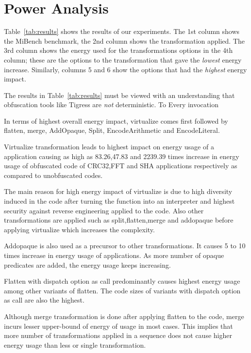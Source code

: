\section{Power Analysis}
\label{sec:analysis}


%

Table~\ref{tab:results} shows the results of our experiments. The 1st column shows the MiBench benchmark, the 2nd column shows the transformation applied. The 3rd column shows the energy used for the transformations options in the 4th column; these are the options to the transformation that gave the {\em lowest} energy increase. Similarly, columns 5 and 6 show the options that had the {\em highest} energy impact.

The results in Table~\ref{tab:results} must be viewed with an understanding that obfuscation tools like Tigress are {\em not} deterministic. To Every invocation 

In terms of highest overall energy impact, virtualize comes first followed by flatten, merge, AddOpaque, Split, EncodeArithmetic and EncodeLiteral.

Virtualize transformation leads to highest impact on energy usage of a application causing as high as 83.26,47.83 and 2239.39 times increase in energy usage of obfuscated code of CRC32,FFT and SHA applications respectively as compared to unobfuscated codes.

The main reason for high energy impact of virtualize is due to high diversity induced in the code after turning the function into an interpreter and highest security against reverse engineering applied to the code. Also other transformations are applied such as split,flatten,merge and addopaque before applying virtualize which increases the complexity. 

Addopaque is also used as a precursor to other transformations. It causes 5 to 10 times increase in energy usage of applications. As more number of opaque predicates are added, the energy usage keeps increasing.

Flatten with dispatch option as call predominantly causes highest energy usage among other variants of flatten. The code sizes of variants with dispatch option as call are also the highest.

Although merge transformation is done after applying flatten to the code, merge incurs lesser upper-bound of energy of usage in most cases. This implies that more number of transformations applied in a sequence does not cause higher energy usage than less or single transformation.

